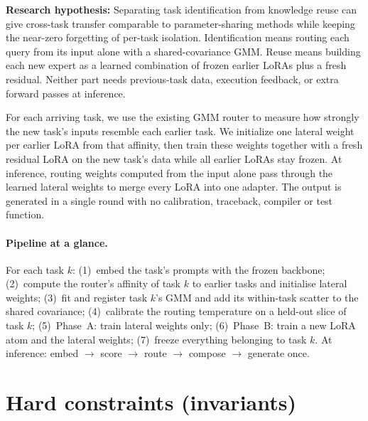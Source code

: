 \documentclass[11pt]{article}
\begin{document}
\medskip
\noindent\textbf{Research hypothesis:} Separating task identification from knowledge reuse can give cross-task
transfer comparable to parameter-sharing methods while keeping the near-zero forgetting of per-task isolation.
Identification means routing each query from its input alone with a shared-covariance GMM. Reuse means building
each new expert as a learned combination of frozen earlier LoRAs plus a fresh residual. Neither part needs
previous-task data, execution feedback, or extra forward passes at inference.

\medskip
\noindent For each arriving task, we use the existing GMM router to measure how strongly the new task's inputs
resemble each earlier task. We initialize one lateral weight per earlier LoRA from that affinity, then train these
weights together with a fresh residual LoRA on the new task's data while all earlier LoRAs stay frozen. At
inference, routing weights computed from the input alone pass through the learned lateral weights to merge every
LoRA into one adapter. The output is generated in a single round with no calibration, traceback, compiler or test
function.

\paragraph{Pipeline at a glance.} For each task $k$: (1)~embed the task's prompts with the frozen backbone;
(2)~compute the router's affinity of task $k$ to earlier tasks and initialise lateral weights; (3)~fit and
register task $k$'s GMM and add its within-task scatter to the shared covariance; (4)~calibrate the routing
temperature on a held-out slice of task $k$; (5)~Phase~A: train lateral weights only; (6)~Phase~B: train a new
LoRA atom and the lateral weights; (7)~freeze everything belonging to task $k$. At inference: embed
$\rightarrow$ score $\rightarrow$ route $\rightarrow$ compose $\rightarrow$ generate once.

\section{Hard constraints (invariants)}\label{sec:invariants}
\end{document}
